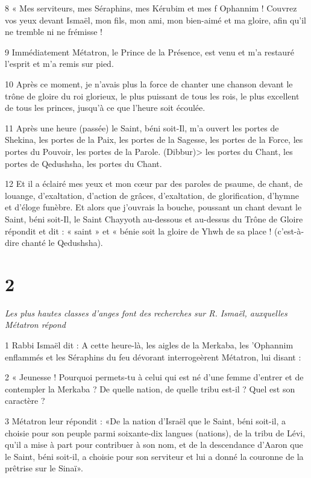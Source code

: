 \par 8 « Mes serviteurs, mes Séraphins, mes Kérubim et mes f Ophannim ! Couvrez vos yeux devant Ismaël, mon fils, mon ami, mon bien-aimé et ma gloire, afin qu'il ne tremble ni ne frémisse !

\par 9 Immédiatement Métatron, le Prince de la Présence, est venu et m'a restauré l'esprit et m'a remis sur pied.

\par 10 Après ce moment, je n'avais plus la force de chanter une chanson devant le trône de gloire du roi glorieux, le plus puissant de tous les rois, le plus excellent de tous les princes, jusqu'à ce que l'heure soit écoulée.

\par 11 Après une heure (passée) le Saint, béni soit-Il, m'a ouvert les portes de Shekina, les portes de la Paix, les portes de la Sagesse, les portes de la Force, les portes du Pouvoir, les portes de la Parole. (Dibbur)> les portes du Chant, les portes de Qedushsha, les portes du Chant.

\par 12 Et il a éclairé mes yeux et mon cœur par des paroles de psaume, de chant, de louange, d'exaltation, d'action de grâces, d'exaltation, de glorification, d'hymne et d'éloge funèbre. Et alors que j'ouvrais la bouche, poussant un chant devant le Saint, béni soit-Il, le Saint Chayyoth au-dessous et au-dessus du Trône de Gloire répondit et dit : « saint » et « bénie soit la gloire de Yhwh de sa place ! (c'est-à-dire chanté le Qedushsha).

\chapter{2}

\par \textit{Les plus hautes classes d'anges font des recherches sur R. Ismaël, auxquelles Métatron répond}

\par 1 Rabbi Ismaël dit : A cette heure-là, les aigles de la Merkaba, les 'Ophannim enflammés et les Séraphins du feu dévorant interrogeèrent Métatron, lui disant :

\par 2 « Jeunesse ! Pourquoi permets-tu à celui qui est né d'une femme d'entrer et de contempler la Merkaba ? De quelle nation, de quelle tribu est-il ? Quel est son caractère ?

\par 3 Métatron leur répondit : «De la nation d'Israël que le Saint, béni soit-il, a choisie pour son peuple parmi soixante-dix langues (nations), de la tribu de Lévi, qu'il a mise à part pour contribuer à son nom, et de la descendance d'Aaron que le Saint, béni soit-il, a choisie pour son serviteur et lui a donné la couronne de la prêtrise sur le Sinaï».

